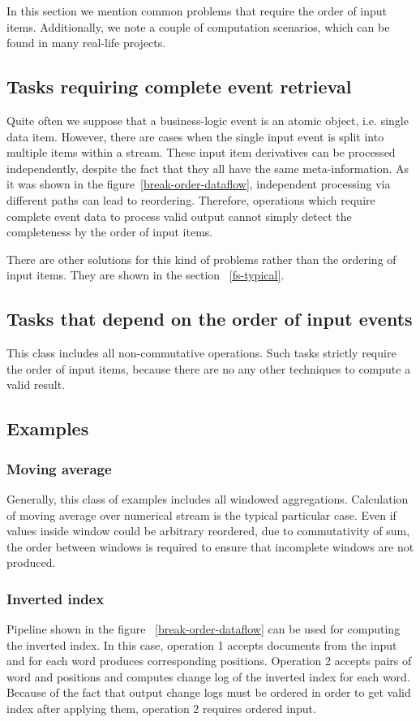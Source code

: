 
\label {fs-tasks}

In this section we mention common problems that require the order of input items. Additionally, we note a couple of computation scenarios, which can be found in many real-life projects.

\subsection{Tasks requiring complete event retrieval}
Quite often we suppose that a business-logic event is an atomic object, i.e. single data item. However, there are cases when the single input event is split into multiple items within a stream. These input item derivatives can be processed independently, despite the fact that they all have the same meta-information. As it was shown in the figure~\ref{break-order-dataflow}, independent processing via different paths can lead to reordering. Therefore, operations which require complete event data to process valid output cannot simply detect the completeness by the order of input items.

There are other solutions for this kind of problems rather than the ordering of input items. They are shown in the section ~\ref{fs-typical}. 

\subsection{Tasks that depend on the order of input events}
This class includes all non-commutative operations. Such tasks strictly require the order of input items, because there are no any other techniques to compute a valid result.

\subsection{Examples}

\subsubsection{Moving average}
Generally, this class of examples includes all windowed aggregations. Calculation of moving average over numerical stream is the typical particular case. Even if values inside window could be arbitrary reordered, due to commutativity of sum, the order between windows is required to ensure that incomplete windows are not produced.

\subsubsection{Inverted index}
Pipeline shown in the figure ~\ref{break-order-dataflow} can be used for computing the inverted index. In this case, operation 1 accepts documents from the input and for each word produces corresponding positions. Operation 2 accepts pairs of word and positions and computes change log of the inverted index for each word. Because of the fact that output change logs must be ordered in order to get valid index after applying them, operation 2 requires ordered input. 
